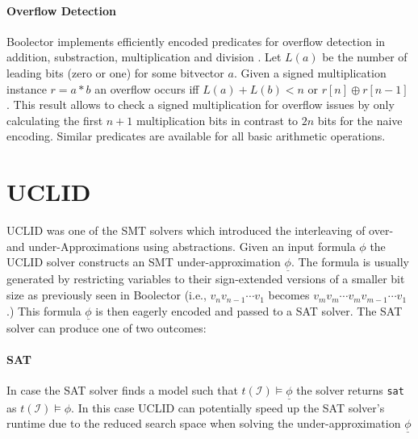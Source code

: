 \paragraph{Overflow Detection}
Boolector implements efficiently encoded predicates for overflow detection in addition, substraction, multiplication and division \cite{Brummayer-PhD}. Let $L\left(a\right)$ be the number of leading bits (zero or one) for some bitvector $a$. Given a signed multiplication instance $r=a*b$  an overflow occurs iff $L\left(a\right) + L\left(b\right) < n$ or $r\left[n\right] \oplus r\left[n-1\right]$ \cite{schulteGokMulOv}. This result allows to check a signed multiplication for overflow issues by only calculating the first $n+1$ multiplication bits in contrast to $2n$ bits for the naive encoding. Similar predicates are available for all basic arithmetic operations.

\section{UCLID}
\textsc{UCLID} \cite{Bryant2007_Chapter_DecidingBit-VectorArithmeticWi-UCLID} was one of the SMT solvers which introduced the interleaving of over- and under-Approximations using abstractions. Given an input formula $\phi$ the \textsc{UCLID} solver constructs an SMT under-approximation $\underline{\phi}$. The formula is usually generated by restricting variables to their sign-extended versions of a smaller bit size as previously seen in Boolector (i.e., $v_nv_{n-1}\dotsi v_1$ becomes $v_mv_m\dotsi v_m v_{m-1}\dotsi v_1$.)  This formula $\underline{\phi}$ is then eagerly encoded and passed to a SAT solver. The SAT solver can produce one of two outcomes:

\paragraph{SAT} In case the SAT solver finds a model such that $t\left(\mathcal{I}\right)\vDash\underline{\phi}$ the solver returns \texttt{sat} as $t\left(\mathcal{I}\right)\vDash\phi$. In this case \textsc{UCLID} can potentially speed up the SAT solver's runtime due to the reduced search space when solving the under-approximation $\underline{\phi}$

